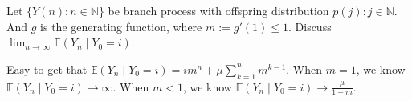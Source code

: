 \documentclass{ctexart}
\begin{document}
\begin{problem}\label{pro:6}
  Let \(\{Y(n): n \in \mathbb{N}\}\) be branch process with offspring distribution \(p(j): j \in \mathbb{N}\).
  And \(g\) is the generating function, where \(m :=g' (1) \leq 1\).
  Discuss \(\lim_{n \to \infty}\mathbb{E}(Y_n \mid Y_0=i)\).
\end{problem}
\begin{solution}
  Easy to get that \(\mathbb{E}(Y_n \mid Y_0=i)=im^n+\mu \sum_{k=1}^{n} m^{k-1}\).
  When \(m=1\), we know \(\mathbb{E}(Y_n \mid Y_0=i) \to \infty\).
  When \(m<1\), we know \(\mathbb{E}(Y_n \mid Y_0=i)\to \frac{\mu}{1-m}\).
\end{solution}
\end{document}
